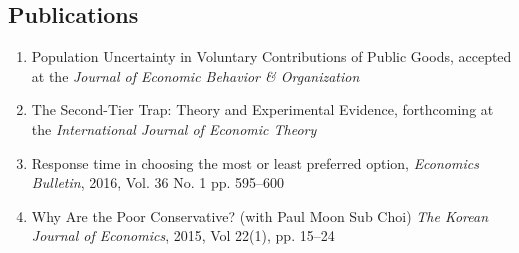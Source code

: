 \documentclass[margin]{res}
\begin{document}
\begin{resume}
\section{Publications}
\begin{enumerate}
\item Population Uncertainty in Voluntary Contributions of Public Goods, accepted at the \emph{Journal of Economic Behavior \& Organization}
\item The Second-Tier Trap: Theory and Experimental Evidence, forthcoming at the \emph{International Journal of Economic Theory}
\item Response time in choosing the most or least preferred option, \textit{Economics Bulletin}, 2016, Vol. 36 No. 1 pp. 595--600
\item Why Are the Poor Conservative? (with Paul Moon Sub Choi) \textit{The Korean Journal of Economics}, 2015, Vol 22(1), pp. 15--24
\end{enumerate}

%


\end{resume}
\end{document}
